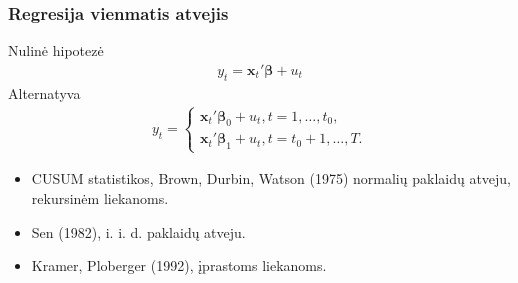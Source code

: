 \documentclass[utf8,hyperref={unicode}]{beamer}
\theoremstyle{change}\newtheorem{teorema}{Teiginys}
\theoremstyle{change}\newtheorem{salyga}{}
\newcommand{\bb}{\bm{\beta}}
\newcommand{\bx}{\mathbf{x}}
\begin{document}
\begin{frame}
    \frametitle{Regresija vienmatis atvejis}
    Nulinė hipotezė	
    \begin{align}\label{m:uni}
    y_t=\bx_{t}'\bb+u_t
\end{align}
Alternatyva
\begin{align}\label{m:unialt}
    y_t=\begin{cases}
	    \bx_{t}'\bb_0+u_t, t=1,\dots,t_0,\\
	    \bx_t'\bb_1+u_t, t=t_0+1,\dots,T.
    \end{cases}
\end{align}

    \begin{itemize}
	\item CUSUM statistikos, Brown, Durbin, Watson (1975) normalių paklaidų
	    atveju, rekursinėm liekanoms.
	\item Sen (1982), i. i. d. paklaidų atveju.
	\item Kramer, Ploberger (1992), įprastoms liekanoms.
    \end{itemize}
\end{frame}
\end{document}

